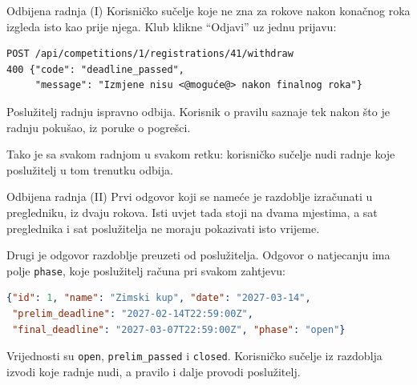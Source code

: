 \begin{frame}[fragile]{Odbijena radnja (I)}
Korisničko sučelje koje ne zna za rokove nakon konačnog roka izgleda isto kao prije njega. Klub klikne \enquote{Odjavi} uz jednu prijavu:

\begin{lstlisting}
POST /api/competitions/1/registrations/41/withdraw
400 {"code": "deadline_passed",
     "message": "Izmjene nisu <@moguće@> nakon finalnog roka"}
\end{lstlisting}

\vspace{0.5em}
Poslužitelj radnju ispravno odbija. Korisnik o pravilu saznaje tek nakon što je radnju pokušao, iz poruke o pogrešci.

\vspace{0.5em}
Tako je sa svakom radnjom u svakom retku: korisničko sučelje nudi radnje koje poslužitelj u tom trenutku odbija.
\end{frame}

\begin{frame}[fragile]{Odbijena radnja (II)}
Prvi odgovor koji se nameće je razdoblje izračunati u pregledniku, iz dvaju rokova. Isti uvjet tada stoji na dvama mjestima, a sat preglednika i sat poslužitelja ne moraju pokazivati isto vrijeme.

\vspace{0.4em}
Drugi je odgovor razdoblje preuzeti od poslužitelja. Odgovor o natjecanju ima polje \texttt{phase}, koje poslužitelj računa pri svakom zahtjevu:

\begin{lstlisting}[language=json]
{"id": 1, "name": "Zimski kup", "date": "2027-03-14",
 "prelim_deadline": "2027-02-14T22:59:00Z",
 "final_deadline": "2027-03-07T22:59:00Z", "phase": "open"}
\end{lstlisting}

\vspace{0.3em}
Vrijednosti su \texttt{open}, \texttt{prelim\_passed} i \texttt{closed}. Korisničko sučelje iz razdoblja izvodi koje radnje nudi, a pravilo i dalje provodi poslužitelj.
\end{frame}

